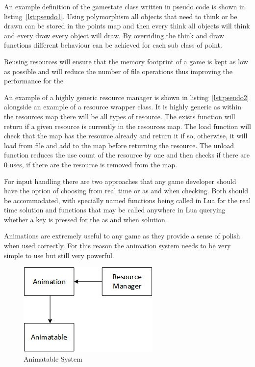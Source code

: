 \documentclass[11pt,a4paper,titlepage]{report}
\begin{document}
	An example definition of the gamestate class written in pseudo code is shown in listing~\ref{lst:pseudo1}. Using polymorphism all objects that need to think or be drawn can be stored in the points map and then every think all objects will think and every draw every object will draw. By overriding the think and draw functions different behaviour can be achieved for each sub class of point.

	Reusing resources will ensure that the memory footprint of a game is kept as low as possible and will reduce the number of file operations thus improving the performance for the 
	
	\singlespacing
	
	\onehalfspacing

	An example of a highly generic resource manager is shown in listing~\ref{lst:pseudo2} alongside an example of a resource wrapper class. It is highly generic as within the resources map there will be all types of resource. The exists function will return if a given resource is currently in the resources map. The load function will check that the map has the resource already and return it if so, otherwise, it will load from file and add to the map before returning the resource. The unload function reduces the use count of the resource by one and then checks if there are 0 uses, if there are the resource is removed from the map.


	For input handling there are two approaches that any game developer should have the option of choosing from real time or as and when checking. Both should be accommodated, with specially named functions being called in Lua for the real time solution and functions that may be called anywhere in Lua querying whether a key is pressed for the as and when solution.


	Animations are extremely useful to any game as they provide a sense of polish when used correctly. For this reason the animation system needs to be very simple to use but still very powerful.

	\begin{figure}[h] 
		\centering
		\includegraphics[scale=0.75]{animation1}
		\caption{Animatable System}
		\label{fig:Animation1}
	\end{figure}
\end{document}

